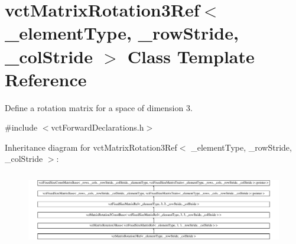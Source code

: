 \hypertarget{classvct_matrix_rotation3_ref}{\section{vct\-Matrix\-Rotation3\-Ref$<$ \-\_\-element\-Type, \-\_\-row\-Stride, \-\_\-col\-Stride $>$ Class Template Reference}
\label{classvct_matrix_rotation3_ref}
}


Define a rotation matrix for a space of dimension 3.  




{\ttfamily \#include $<$vct\-Forward\-Declarations.\-h$>$}

Inheritance diagram for vct\-Matrix\-Rotation3\-Ref$<$ \-\_\-element\-Type, \-\_\-row\-Stride, \-\_\-col\-Stride $>$\-:\begin{figure}[H]
\begin{center}
\leavevmode
\includegraphics[height=3.297350cm]{db/d0b/classvct_matrix_rotation3_ref}
\end{center}
\end{figure}
